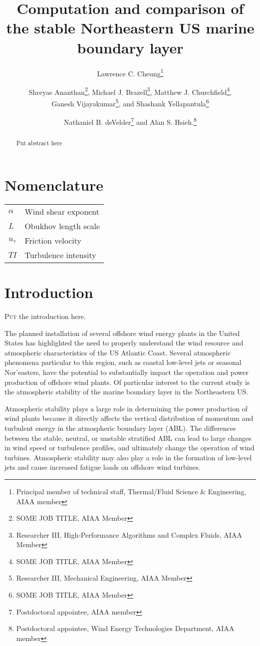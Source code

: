 \documentclass[conf]{new-aiaa}
\title{Computation and comparison of the stable Northeastern US marine boundary layer}
\author{Lawrence C. Cheung\footnote{Principal member of technical staff, Thermal/Fluid Science \& Engineering, AIAA member}}
\affil{Sandia National Laboratories, Livermore, CA 94550}
\author{
  Shreyas Ananthan\footnote{SOME JOB TITLE, AIAA Member},
  Michael J. Brazell\footnote{Researcher III, High-Performance Algorithms and Complex Fluids, AIAA Member},
  Matthew J. Churchfield\footnote{SOME JOB TITLE, AIAA Member}, \\
  Ganesh Vijayakumar\footnote{Researcher III, Mechanical Engineering, AIAA Member}, and
  Shashank Yellapantula\footnote{SOME JOB TITLE, AIAA Member}
}
\affil{National Renewable Energy Laboratory, Golden CO 80401}
\author{Nathaniel B. deVelder\footnote{Postdoctoral appointee, AIAA member} and
  Alan S. Hsieh.\footnote{Postdoctoral appointee, Wind Energy Technologies Department, AIAA member}}
\affil{Sandia National Laboratories, Albuquerque, NM 87185}
\begin{document}
\maketitle

\begin{abstract}
Put abstract here
\end{abstract}

\section{Nomenclature}

{\renewcommand\arraystretch{1.0}
\noindent\begin{longtable*}{@{}l @{\quad=\quad} l@{}}
$\alpha$  & Wind shear exponent  \\
$L$       & Obukhov length scale \\
$u_\tau$   & Friction velocity    \\
$TI$      & Turbulence intensity 
\end{longtable*}}

\section{Introduction}

\lettrine{P}{ut} the introduction here.

The planned installation of several offshore wind energy plants in the
United States has highlighted the need to properly understand the wind
resource and atmospheric characteristics of the US Atlantic Coast.
Several atmospheric phenomena particular to this region, such as
coastal low-level jets or seasonal Nor’easters, have the potential to
substantially impact the operation and power production of offshore
wind plants.  Of particular interest to the current study is the
atmospheric stability of the marine boundary layer in the Northeastern
US.

Atmospheric stability plays a large role in determining the power
production of wind plants because it directly affects the vertical
distribution of momentum and turbulent energy in the atmospheric
boundary layer (ABL).  The differences between the stable, neutral, or
unstable stratified ABL can lead to large changes in wind speed or
turbulence profiles, and ultimately change the operation of wind
turbines.  Atmospheric stability may also play a role in the formation
of low-level jets \cite{nunalee2014mesoscale} and cause increased
fatigue loads on offshore wind turbines.
\end{document}
